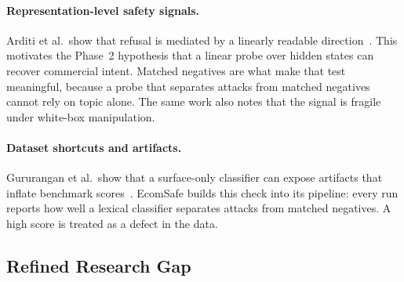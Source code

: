 \documentclass[sigconf,nonacm]{acmart}
\begin{document}
\paragraph{Representation-level safety signals.}
Arditi et al.\ show that refusal is mediated by a linearly readable direction~\cite{arditi2024refusal}. This motivates the Phase~2 hypothesis that a linear probe over hidden states can recover commercial intent. Matched negatives are what make that test meaningful, because a probe that separates attacks from matched negatives cannot rely on topic alone. The same work also notes that the signal is fragile under white-box manipulation.

\paragraph{Dataset shortcuts and artifacts.}
Gururangan et al.\ show that a surface-only classifier can expose artifacts that inflate benchmark scores~\cite{gururangan2018annotation}. EcomSafe builds this check into its pipeline: every run reports how well a lexical classifier separates attacks from matched negatives. A high score is treated as a defect in the data.

\subsection{Refined Research Gap}
\label{sec:rw-gap}
\end{document}
